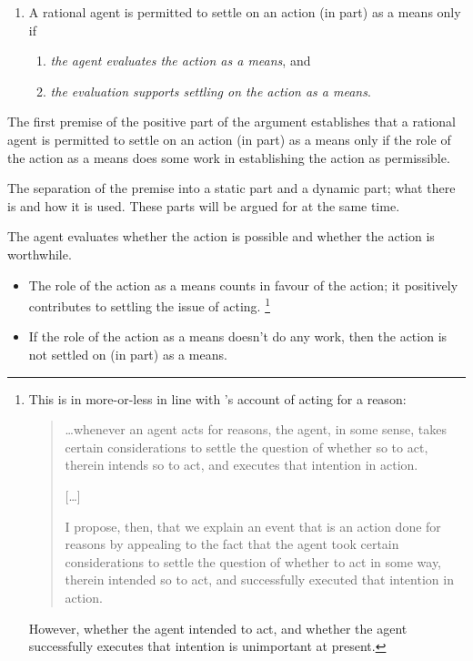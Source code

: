 \documentclass[10pt]{article}
\newcommand{\hozlinedash}[0]{%
  \noindent\hdashrule[0.5ex][c]{\textwidth}{.1pt}{2.5pt}
}
\begin{document}
\begin{enumerate}[label=P\arabic*., ref=(P\arabic*)]
\item A rational agent is permitted to settle on an action (in part) as a means only if
  \begin{enumerate}[label=P\arabic{enumi}\alph*., ref=(P\arabic{enumi}\alph*)]
  \item \emph{the agent evaluates the action as a means}, and
  \item \emph{the evaluation supports settling on the action as a means}.
  \end{enumerate}
\end{enumerate}

\hozlinedash


The first premise of the positive part of the argument establishes that a rational agent is permitted to settle on an action (in part) as a means only if the role of the action as a means does some work in establishing the action as permissible.

The separation of the premise into a static part and a dynamic part; what there is and how it is used.
These parts will be argued for at the same time.

\hozlinedash


The agent evaluates whether the action is possible and whether the action is worthwhile.

\begin{itemize}[noitemsep]
\item The role of the action as a means counts in favour of the action; it positively contributes to settling the issue of acting.\nolinebreak
\footnote{This is in more-or-less in line with \citeauthor{Hieronymi:2011aa}'s account of acting for a reason:
  \begin{quote}
    \dots whenever an agent acts for reasons, the agent, in some sense, takes certain considerations to settle the question of whether so to act, therein intends so to act, and executes that intention in action.
    \begin{center}
      [\dots]
    \end{center}
    I propose, then, that we explain an event that is an action done for reasons by appealing to the fact that the agent took certain considerations to settle the question of whether to act in some way, therein intended so to act, and successfully executed that intention in action.
    \cite[421]{Hieronymi:2011aa}
  \end{quote}
  However, whether the agent intended to act, and whether the agent successfully executes that intention is unimportant at present.
}
\item If the role of the action as a means doesn't do any work, then the action is not settled on (in part) as a means.
\end{itemize}
\end{document}

